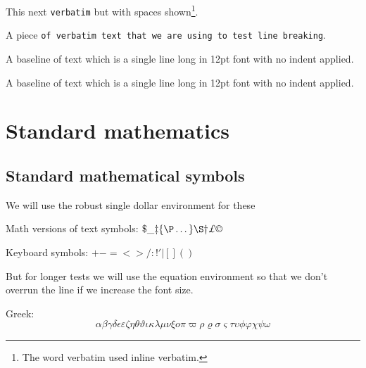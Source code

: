 \documentclass[12pt,a4paper]{article}
\begin{document}
This next \verb=verbatim= but with spaces shown\footnote{The word verbatim used inline verbatim.}. 

\bigskip
A piece \verb=of verbatim text that we are using to test line breaking=.


\bigskip

\noindent
A baseline of text which is a single line long in 12pt font with no indent applied.

\vspace{4\baselineskip}

\noindent
A baseline of text which is a single line long in 12pt font with no indent applied.\marginpar{\rule[-1ex]{0.3em}{4ex}}

\newpage

\section{Standard mathematics}

\subsection{Standard mathematical symbols\label{maths-symbols}}

We will use the robust single dollar environment for these

Math versions of text symbols: $\$  \_  \ddag  \{  \P  \dots  \}  \S  \dag  \pounds \copyright$

Keyboard symbols: $+  -  =  <  >  /  :  !  '  |  [  ]  (  )$

\noindent 
But for longer tests we will use the equation environment so that we don't overrun the line if we increase the font size.

Greek:
\begin{equation}
\alpha  \beta  \gamma  \delta  \epsilon  \varepsilon  \zeta  \eta  \theta  \vartheta  \iota  \kappa  \lambda  \mu  \nu  \xi  o  \pi  \varpi  \rho  \varrho  \sigma  \varsigma  \tau  \upsilon  \phi  \varphi  \chi  \psi  \omega
\end{equation}
\end{document}
